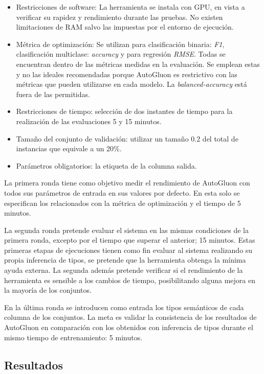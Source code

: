\begin{itemize}
    \item Restricciones de software: La herramienta se instala con GPU, en vista a verificar su rapidez y rendimiento durante las pruebas. No existen limitaciones de RAM salvo
    las impuestas por el entorno de ejecución.
    \item Métrica de optimización: Se utilizan para clasificación binaria: \textit{F1}, clasificación multiclase: \textit{accuracy} y para regresión \textit{RMSE}. Todas se 
    encuentran dentro de las métricas medidas en la evaluación. Se emplean estas y no las ideales recomendadas porque AutoGluon es restrictivo con las métricas que 
    pueden utilizarse en cada modelo. La \textit{balanced-accuracy} está fuera de las permitidas.
    \item Restricciones de tiempo: selección de dos instantes de tiempo para la realización de las evaluaciones 5 y 15 minutos.
    \item Tamaño del conjunto de validación: utilizar un tamaño 0.2 del total de instancias que equivale a un 20\%. 
    \item Parámetros obligatorios: la etiqueta de la columna salida.  
  \end{itemize}
  
  La primera ronda tiene como objetivo medir el rendimiento de AutoGluon con todos sus parámetros de entrada en sus valores por defecto. En esta solo se especifican los 
  relacionados con la métrica de optimización y el tiempo de 5 minutos. 
  
  La segunda ronda pretende evaluar el sistema en las mismas condiciones de la primera ronda, excepto por el tiempo que superar el anterior; 15 minutos.
  Estas primeras etapas de ejecuciones tienen como fin evaluar al sistema realizando su propia inferencia de tipos, se pretende que la herramienta obtenga la mínima
  ayuda externa. La segunda además pretende verificar si el rendimiento de la herramienta es sensible a los cambios de tiempo, posibilitando alguna 
  mejora en la mayoría de los conjuntos.
  
  En la última ronda se introducen como entrada los tipos semánticos de cada columna de los conjuntos. La meta es validar la consistencia de los resultados de 
  AutoGluon en comparación con los obtenidos con inferencia de tipos durante el mismo tiempo de entrenamiento: 5 minutos. 

\subsection{Resultados}\label{subsection:results}


